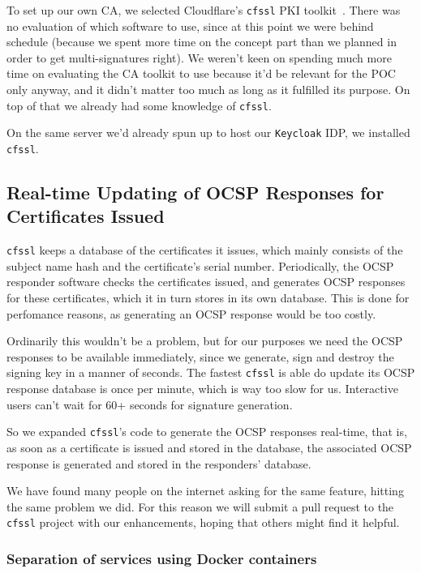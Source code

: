 To set up our own \gls{CA}, we selected Cloudflare's \texttt{cfssl} \gls{PKI} toolkit~\cite{cfssl}.
There was no evaluation of which software to use,
since at this point we were behind schedule
(because we spent more time on the concept part than we planned in order to get multi-signatures right).
We weren't keen on spending much more time on evaluating the \gls{CA} toolkit to use because it'd be relevant for the \gls{POC} only anyway,
and it didn't matter too much as long as it fulfilled its purpose.
On top of that we already had some knowledge of \texttt{cfssl}.

On the same server we'd already spun up to host our \texttt{Keycloak} \gls{IDP},
we installed \texttt{cfssl}.

\subsection{Real-time Updating of OCSP Responses for Certificates Issued}\label{subsec:real-time-updating-of-ocsp-responses-for-certificates-issued}
\texttt{cfssl} keeps a database of the certificates it issues,
which mainly consists of the subject name hash and the certificate's serial number.
Periodically, the \gls{OCSP} responder software checks the certificates issued,
and generates \gls{OCSP} responses for these certificates,
which it in turn stores in its own database.
This is done for perfomance reasons,
as generating an \gls{OCSP} response would be too costly.

Ordinarily this wouldn't be a problem, but for our purposes we need the \gls{OCSP} responses to be available immediately,
since we generate, sign and destroy the signing key in a manner of seconds.
The fastest \texttt{cfssl} is able do update its \gls{OCSP} response database is once per minute,
which is way too slow for us.
Interactive users can't wait for 60+ seconds for signature generation.

So we expanded \texttt{cfssl}'s code to generate the \gls{OCSP} responses real-time,
that is, as soon as a certificate is issued and stored in the database,
the associated \gls{OCSP} response is generated and stored in the responders' database.

We have found many people on the internet asking for the same feature,
hitting the same problem we did.
For this reason we will submit a pull request to the \texttt{cfssl} project with our enhancements,
hoping that others might find it helpful.

\subsubsection{Separation of services using Docker containers}

